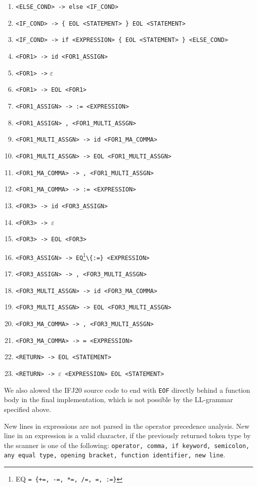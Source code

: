\documentclass[12pt]{article}
\begin{document}
\begin{enumerate}
	\item \verb=<ELSE_COND> -> else <IF_COND>=
	\item \verb=<IF_COND> -> { EOL <STATEMENT> } EOL <STATEMENT>=
	\item \verb=<IF_COND> -> if <EXPRESSION> { EOL <STATEMENT> } <ELSE_COND>=
	\item \verb!<FOR1> -> id <FOR1_ASSIGN>!
	\item \verb!<FOR1> ->! $\varepsilon$
	\item \verb!<FOR1> -> EOL <FOR1>!
	\item \verb!<FOR1_ASSIGN> -> := <EXPRESSION>!
	\item \verb!<FOR1_ASSIGN> , <FOR1_MULTI_ASSGN>!
	\item \verb!<FOR1_MULTI_ASSGN> -> id <FOR1_MA_COMMA>!
	\item \verb!<FOR1_MULTI_ASSGN> -> EOL <FOR1_MULTI_ASSGN>!
	\item \verb!<FOR1_MA_COMMA> -> , <FOR1_MULTI_ASSGN>!
	\item \verb!<FOR1_MA_COMMA> -> := <EXPRESSION>!
	\item \verb!<FOR3> -> id <FOR3_ASSIGN>!
	\item \verb!<FOR3> -> !$\varepsilon$
	\item \verb!<FOR3> -> EOL <FOR3>!
	\item \verb!<FOR3_ASSIGN> -> EQ!\footnote[4]{EQ \texttt{= \{+=, -=, *=, /=, =, :=\}}}\verb!\{:=} <EXPRESSION>!
	\item \verb!<FOR3_ASSIGN> -> , <FOR3_MULTI_ASSGN>!
	\item \verb!<FOR3_MULTI_ASSGN> -> id <FOR3_MA_COMMA>!
	\item \verb!<FOR3_MULTI_ASSGN> -> EOL <FOR3_MULTI_ASSGN>!
	\item \verb!<FOR3_MA_COMMA> -> , <FOR3_MULTI_ASSGN>!
	\item \verb!<FOR3_MA_COMMA> -> = <EXPRESSION>!
	\item \verb=<RETURN> -> EOL <STATEMENT>=
	\item \verb=<RETURN> -> =$\varepsilon$\verb= <EXPRESSION> EOL <STATEMENT>=
\end{enumerate}
\vspace{0.5cm}
\par
We also alowed the IFJ20 source code to end with \texttt{EOF} directly behind a function body in the final implementation, which is not possible by the LL-grammar specified above.\par
New lines in expressions are not parsed in the operator precedence analysis. New line in an expression is a valid character, if the previously returned token type by the scanner is one of the following: \texttt{operator, comma, if keyword, semicolon, any equal type, opening bracket, function identifier, new line}.
\end{document}

